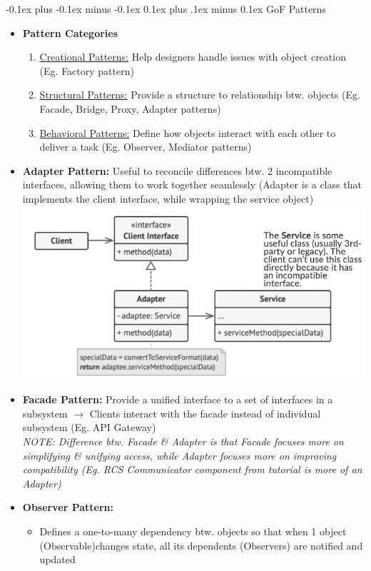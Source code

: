 \documentclass[landscape]{article}
\makeatletter
\renewcommand{\subsection}{\@startsection{subsection}{2}{0mm}%
  {-0.1ex plus -0.1ex minus -0.1ex}%
  {0.1ex plus .1ex minus 0.1ex}%
{\normalfont\scriptsize\bfseries}}
\makeatother
\begin{document}
\begin{multicols*}{5}
    \subsection{GoF Patterns}
    \begin{itemize}
      \item \textbf{Pattern Categories}
      \begin{enumerate}
        \item \underline{Creational Patterns:} Help designers handle issues with object creation (Eg. Factory pattern)
        \item \underline{Structural Patterns:} Provide a structure to relationship btw. objects (Eg. Facade, Bridge, Proxy, Adapter patterns)
        \item \underline{Behavioral Patterns:} Define how objects interact with each other to deliver a task (Eg. Observer, Mediator patterns)
      \end{enumerate}
      \item \textbf{Adapter Pattern:} Useful to reconcile differences btw. 2 incompatible interfaces, allowing them to work together seamlessly (Adapter is a class that implements the client interface, while wrapping the service object)
      \includegraphics[width=0.85\linewidth]{12_adapter_pattern.png}
      \item \textbf{Facade Pattern:} Provide a unified interface to a set of interfaces in a subsystem $\rightarrow$ Clients interact with the facade instead of individual subsystem (Eg. API Gateway) \\
      \textit{NOTE: Difference btw. Facade \& Adapter is that Facade focuses more on simplifying \& unifying access, while Adapter focuses more on improving compatibility (Eg. RCS Communicator component from tutorial is more of an Adapter)}
      \item \textbf{Observer Pattern:}
      \begin{itemize}
        \item Defines a one-to-many dependency btw. objects so that when 1 object (Observable)changes state, all its dependents (Observers) are notified and updated

\end{itemize}
\end{itemize}
\end{multicols*}
\end{document}
